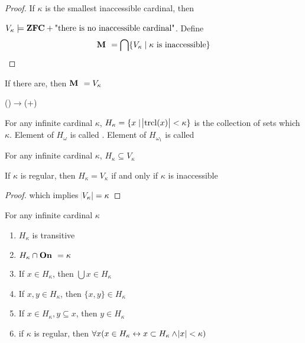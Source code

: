 \documentclass[11pt]{article}
\begin{document}
\begin{proof}
If \(\kappa\) is the smallest inaccessible cardinal, then \par
\(V_\kappa\models\textbf{ZFC}+\text{"there is no inaccessible cardinal"}\). Define
\begin{equation*}
\textbf{M }=\bigcap\{V_\kappa\mid\kappa\text{ is inaccessible}\}
\end{equation*}
\end{proof}
If there are, then \(\textbf{M }=V_\kappa\)

\begin{corollary}[]
\con(\zfcm)\textlnot{}\(\to\)\con(\zfcm+)
\end{corollary}

\begin{definition}[]
For any infinite cardinal \(\kappa\), \(H_\kappa=\{x\mid\abs{\mathrm{trcl}{(x)}}<\kappa\}\)
is the collection of sets which  \(\kappa\).
Element of \(H_\omega\) is called . Element of
\(H_{\omega_1}\) is called 
\end{definition}

\begin{lemma}[]
For any infinite cardinal \(\kappa\), \(H_\kappa\subseteq V_\kappa\)
\end{lemma}

\begin{lemma}[]
If \(\kappa\) is regular, then \(H_\kappa=V_\kappa\) if and only if \(\kappa\) is
inaccessible
\end{lemma}

\begin{proof}
which implies \(\abs{V_\kappa}=\kappa\)
\end{proof}

\begin{lemma}[]
For any infinite cardinal \(\kappa\)
\begin{enumerate}
\item \(H_\kappa\) is transitive
\item \(H_\kappa\cap\textbf{On }=\kappa\)
\item If \(x\in H_\kappa\), then \(\bigcup x\in H_\kappa\)
\item If \(x,y\in H_\kappa\), then \(\{x,y\}\in H_\kappa\)
\item If \(x\in H_\kappa,y\subseteq x\), then \(y\in H_\kappa\)
\item if \(\kappa\) is regular, then \(\forall x(x\in H_\kappa\leftrightarrow
      x\subset H_\kappa\wedge\abs{x}<\kappa)\)
\end{enumerate}
\end{lemma}
\end{document}
